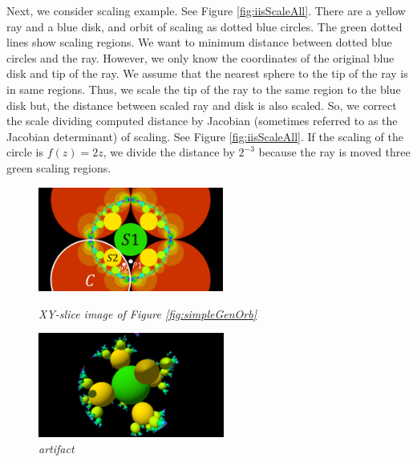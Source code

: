 Next, we consider scaling example.
See Figure \ref{fig:iisScaleAll}.
There are a yellow ray and a blue disk, and orbit of scaling as
dotted blue circles.
The green dotted lines show scaling regions.
We want to minimum distance between dotted blue circles and the ray.
However, we only know the coordinates of the original blue
disk and tip of the ray.
We assume that the nearest sphere to the tip of the ray is in
same regions. 
Thus, we scale the tip of the ray to the same region to the blue disk
but, the distance between scaled ray and disk is also scaled.
So, we correct the scale dividing computed distance by 
Jacobian (sometimes referred to as the Jacobian determinant) of scaling.
See Figure \ref{fig:iisScaleAll}.
If the scaling of the circle is $f(z) = 2z$, we divide the distance by
$2^{-3}$ because the ray is moved three green scaling regions.

\begin{figure}[htbp]
 \begin{minipage}[t]{0.5\hsize}
  \center
  \includegraphics[height=1.35in, keepaspectratio]{img/preparation/slice.png}
  \caption{\textit{XY-slice image of Figure \ref{fig:simpleGenOrb}}}
  \label{fig:slice2d}
  \hspace*{\fill}
 \end{minipage}
 \begin{minipage}[t]{0.5\hsize}
  \center
  \includegraphics[height=1.35in, keepaspectratio]{img/preparation/artifact.pdf}
  \caption{\textit{artifact}}
  \label{fig:3dartifact}
  \hspace*{\fill}
 \end{minipage}
\end{figure}

